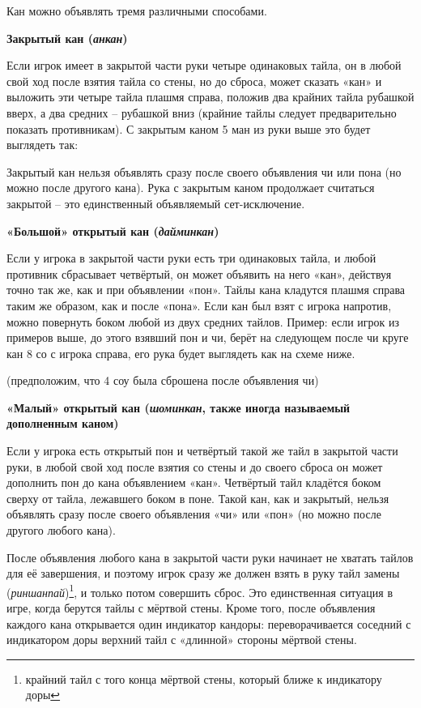 
Кан можно объявлять тремя различными способами.

\textbf{Закрытый кан (\textit{анкан})}

Если игрок имеет в закрытой части руки четыре одинаковых тайла, он в любой свой ход после взятия тайла со стены, но до сброса, может сказать «кан» и выложить эти четыре тайла плашмя справа, положив два крайних тайла рубашкой вверх, а два средних – рубашкой вниз (крайние тайлы следует предварительно показать противникам). С закрытым каном 5 ман из руки выше это будет выглядеть так:

 \hfill {}

Закрытый кан нельзя объявлять сразу после своего объявления чи или пона (но можно после другого кана). Рука с закрытым каном продолжает считаться закрытой – это единственный объявляемый сет-исключение.

\textbf{«Большой» открытый кан (\textit{дайминкан})}

Если у игрока в закрытой части руки есть три одинаковых тайла, и любой противник сбрасывает четвёртый, он может объявить на него «кан», действуя точно так же, как и при объявлении «пон». Тайлы кана кладутся плашмя справа таким же образом, как и после «пона». Если кан был взят с игрока напротив, можно повернуть боком любой из двух средних тайлов. Пример: если игрок из примеров выше, до этого взявший пон и чи, берёт на следующем после чи круге кан 8 со с игрока справа, его рука будет выглядеть как на схеме ниже.

 \hfill {}

(предположим, что 4 соу была сброшена после объявления чи)

\textbf{«Малый» открытый кан (\textit{шоминкан}, также иногда называемый дополненным каном)}

Если у игрока есть открытый пон и четвёртый такой же тайл в закрытой части руки, в любой свой ход после взятия со стены и до своего сброса он может дополнить пон до кана объявлением «кан». Четвёртый тайл кладётся боком сверху от тайла, лежавшего боком в поне. Такой кан, как и закрытый, нельзя объявлять сразу после своего объявления «чи» или «пон» (но можно после другого любого кана).


После объявления любого кана в закрытой части руки начинает не хватать тайлов для её завершения, и поэтому игрок сразу же должен взять в руку тайл замены (\textit{риншанпай})\footnote{крайний тайл с того конца мёртвой стены, который ближе к индикатору доры}, и только потом совершить сброс. Это единственная ситуация в игре, когда берутся тайлы с мёртвой стены. Кроме того, после объявления каждого кана открывается один индикатор кандоры: переворачивается соседний с индикатором доры верхний тайл с «длинной» стороны мёртвой стены.

